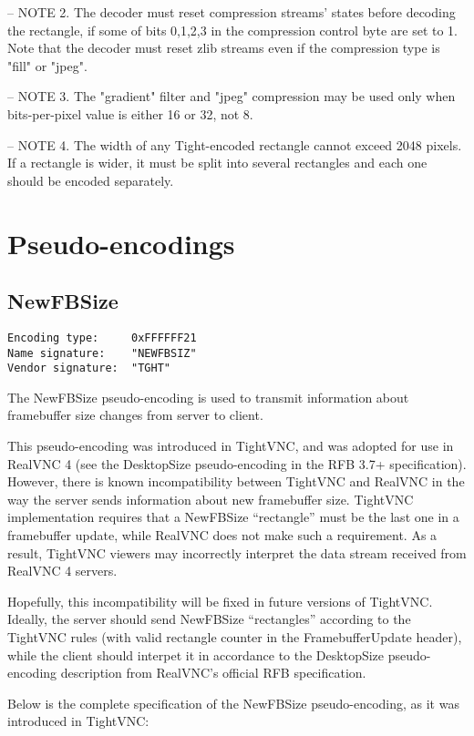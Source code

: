 \documentclass[a4paper]{article}
\begin{document}
-- NOTE 2. The decoder must reset compression streams' states before
 decoding the rectangle, if some of bits 0,1,2,3 in the compression control
 byte are set to 1. Note that the decoder must reset zlib streams even if
 the compression type is "fill" or "jpeg".

-- NOTE 3. The "gradient" filter and "jpeg" compression may be used only
 when bits-per-pixel value is either 16 or 32, not 8.

-- NOTE 4. The width of any Tight-encoded rectangle cannot exceed 2048
 pixels. If a rectangle is wider, it must be split into several rectangles
 and each one should be encoded separately.

\newpage
\section{Pseudo-encodings}
\subsection{NewFBSize}
\begin{verbatim}
Encoding type:     0xFFFFFF21
Name signature:    "NEWFBSIZ"
Vendor signature:  "TGHT"
\end{verbatim}

The NewFBSize pseudo-encoding is used to transmit information about
framebuffer size changes from server to client.

This pseudo-encoding was introduced in TightVNC, and was adopted for
use in RealVNC 4 (see the DesktopSize pseudo-encoding in the RFB 3.7+
specification). However, there is known incompatibility between
TightVNC and RealVNC in the way the server sends information about new
framebuffer size. TightVNC implementation requires that a NewFBSize
``rectangle'' must be the last one in a framebuffer update, while
RealVNC does not make such a requirement. As a result, TightVNC
viewers may incorrectly interpret the data stream received from
RealVNC 4 servers.

Hopefully, this incompatibility will be fixed in future versions of
TightVNC. Ideally, the server should send NewFBSize ``rectangles''
according to the TightVNC rules (with valid rectangle counter in the
FramebufferUpdate header), while the client should interpet it in
accordance to the DesktopSize pseudo-encoding description from
RealVNC's official RFB specification.

Below is the complete specification of the NewFBSize pseudo-encoding,
as it was introduced in TightVNC:
\end{document}
